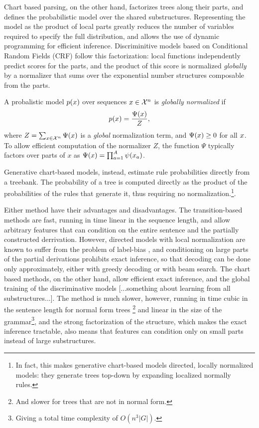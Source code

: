    Chart based parsing, on the other hand, factorizes trees along their parts, and defines the probabilistic model over the shared substructures. Representing the model as the product of local parts greatly reduces the number of variables required to specify the full distribution, and allows the use of dynamic programming for efficient inference. Discriminitive models based on Conditional Random Fields (CRF) \citep{lafferty2001crf} follow this factorization: local functions independently predict scores for the parts, and the product of this score is normalized \textit{globally} by a normalizer that sums over the exponential number structures composable from the parts.
    \begin{definition}{}
      A probalistic model $p(x)$ over sequences $x \in \mathcal{X}^n$ is \textit{globally normalized} if
      \begin{align*}
        p(x) = \frac{ \Psi( x ) }{ Z },
      \end{align*}
      where $Z  = \sum_{x \in \mathcal{X}^n} \Psi( x )$ is a \textit{global} normalization term, and $\Psi (x ) \geq 0$ for all $x$. To allow efficient computation of the normalizer $Z$, the function $\Psi$ typically factors over parts of $x$ as $\Psi ( x ) = \prod_{a=1}^A \psi (x_a )$.
    \end{definition}
    Generative chart-based models, instead, estimate rule probabilities directly from a treebank. The probability of a tree is computed directly as the product of the probabilities of the rules that generate it, thus requiring no normalization.\footnote{In fact, this makes generative chart-based models directed, locally normalized models: they generate trees top-down by expanding localized normally rules.}.

    Either method have their advantages and disadvantages. The transition-based methods are fast, running in time linear in the sequence length, and allow arbitrary features that can condition on the entire sentence and the partially constructed derrivation. However, directed models with local normalization are known to suffer from the problem of label-bias \citep{lafferty2001crf}, and conditioning on large parts of the partial derivations prohibits exact inference, so that decoding can be done only approximately, either with greedy decoding or with beam search. The chart based methods, on the other hand, allow efficient exact inference, and the global training of the discriminative models [...something about learning from all substructures...]. The method is much slower, however, running in time cubic in the sentence length for normal form trees \footnote{And slower for trees that are not in normal form.} and linear in the size of the grammar\footnote{Giving a total time complexity of $O(n^3|G|)$.}, and the strong factorization of the structure, which makes the exact inference tractable, also means that features can condition only on small parts instead of large substructures.

